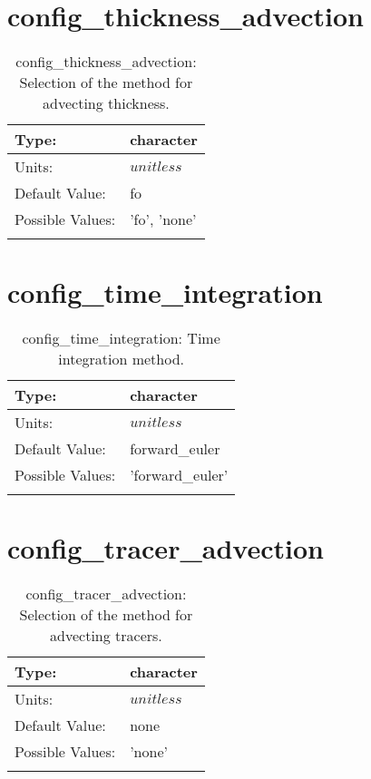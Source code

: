 \section[config\_thickness\_advection]{config\_thickness\_advection}
\label{sec:nm_sec_config_thickness_advection}
\begin{center}
\begin{longtable}{| p{2.0in} || p{4.0in} |}
    \hline
    Type: & character \\
    \hline
    Units: & $unitless$ \\
    \hline
    Default Value: & fo \\
    \hline
    Possible Values: & 'fo', 'none' \\
    \hline
    \caption{config\_thickness\_advection: Selection of the method for advecting thickness.}
\end{longtable}
\end{center}
\section[config\_time\_integration]{config\_time\_integration}
\label{sec:nm_sec_config_time_integration}
\begin{center}
\begin{longtable}{| p{2.0in} || p{4.0in} |}
    \hline
    Type: & character \\
    \hline
    Units: & $unitless$ \\
    \hline
    Default Value: & forward\_euler \\
    \hline
    Possible Values: & 'forward\_euler' \\
    \hline
    \caption{config\_time\_integration: Time integration method.}
\end{longtable}
\end{center}
\section[config\_tracer\_advection]{config\_tracer\_advection}
\label{sec:nm_sec_config_tracer_advection}
\begin{center}
\begin{longtable}{| p{2.0in} || p{4.0in} |}
    \hline
    Type: & character \\
    \hline
    Units: & $unitless$ \\
    \hline
    Default Value: & none \\
    \hline
    Possible Values: & 'none' \\
    \hline
    \caption{config\_tracer\_advection: Selection of the method for advecting tracers.}
\end{longtable}
\end{center}
